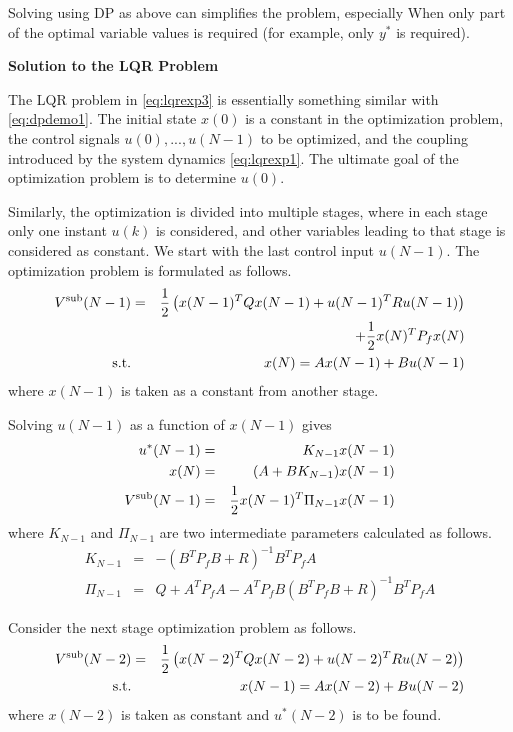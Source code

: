 Solving using DP as above can simplifies the problem, especially When only part of the optimal variable values is required (for example, only $y^*$ is required).

\vspace{0.1in}
\noindent \textbf{Solution to the LQR Problem}
\vspace{0.1in}

The LQR problem in \eqref{eq:lqrexp3} is essentially something similar with \eqref{eq:dpdemo1}. The initial state $x(0)$ is a constant in the optimization problem, the control signals $u(0), ..., u(N-1)$ to be optimized, and the coupling introduced by the system dynamics \eqref{eq:lqrexp1}. The ultimate goal of the optimization problem is to determine $u(0)$.

Similarly, the optimization is divided into multiple stages, where in each stage only one instant $u(k)$ is considered, and other variables leading to that stage is considered as constant. We start with the last control input $u(N-1)$. The optimization problem is formulated as follows.
\begin{eqnarray}
  V^{\textup{sub}}(N-1) &=& \dfrac{1}{2}\left(x(N-1)^TQx(N-1) + u(N-1)^TRu(N-1)\right) \nonumber \\ && + \dfrac{1}{2}x(N)^TP_fx(N) \nonumber \\
  \textup{s.t.} && x(N) = Ax(N-1) + Bu(N-1) \nonumber
\end{eqnarray}
where $x(N-1)$ is taken as a constant from another stage. 

Solving $u(N-1)$ as a function of $x(N-1)$ gives
\begin{eqnarray}
  u^*(N-1) &=& K_{N-1}x(N-1) \nonumber \\
  x(N) &=& (A+BK_{N-1})x(N-1) \nonumber \\
  V^{\textup{sub}}(N-1) &=& \dfrac{1}{2}x(N-1)^T\Pi_{N-1}x(N-1) \nonumber
\end{eqnarray}
where $K_{N-1}$ and $\Pi_{N-1}$ are two intermediate parameters calculated as follows.
\begin{eqnarray}
K_{N-1} &=& -(B^TP_fB + R)^{-1}B^TP_fA \nonumber \\
\Pi_{N-1} &=& Q + A^TP_fA-A^TP_fB(B^TP_fB+R)^{-1}B^TP_fA \nonumber 
\end{eqnarray}

Consider the next stage optimization problem as follows.
\begin{eqnarray}
  V^{\textup{sub}}(N-2) &=& \dfrac{1}{2}\left(x(N-2)^TQx(N-2) + u(N-2)^TRu(N-2)\right) \nonumber \\
  \textup{s.t.} && x(N-1) = Ax(N-2) + Bu(N-2) \nonumber
\end{eqnarray}
where $x(N-2)$ is taken as constant and $u^*(N-2)$ is to be found.

